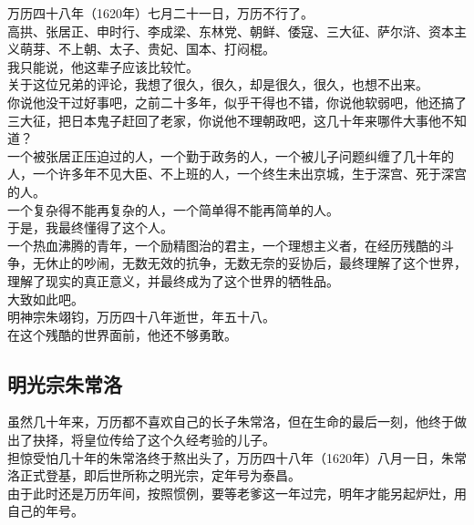 \begin{multicols}{\theparacolNo}
万历四十八年（1620年）七月二十一日，万历不行了。\\

高拱、张居正、申时行、李成梁、东林党、朝鲜、倭寇、三大征、萨尔浒、资本主义萌芽、不上朝、太子、贵妃、国本、打闷棍。\\

我只能说，他这辈子应该比较忙。\\

关于这位兄弟的评论，我想了很久，很久，却是很久，很久，也想不出来。\\

你说他没干过好事吧，之前二十多年，似乎干得也不错，你说他软弱吧，他还搞了三大征，把日本鬼子赶回了老家，你说他不理朝政吧，这几十年来哪件大事他不知道？\\

一个被张居正压迫过的人，一个勤于政务的人，一个被儿子问题纠缠了几十年的人，一个许多年不见大臣、不上班的人，一个终生未出京城，生于深宫、死于深宫的人。\\

一个复杂得不能再复杂的人，一个简单得不能再简单的人。\\

于是，我最终懂得了这个人。\\

一个热血沸腾的青年，一个励精图治的君主，一个理想主义者，在经历残酷的斗争，无休止的吵闹，无数无效的抗争，无数无奈的妥协后，最终理解了这个世界，理解了现实的真正意义，并最终成为了这个世界的牺牲品。\\

大致如此吧。\\

明神宗朱翊钧，万历四十八年逝世，年五十八。\\

在这个残酷的世界面前，他还不够勇敢。\\

\subsection{明光宗朱常洛}
虽然几十年来，万历都不喜欢自己的长子朱常洛，但在生命的最后一刻，他终于做出了抉择，将皇位传给了这个久经考验的儿子。\\

担惊受怕几十年的朱常洛终于熬出头了，万历四十八年（1620年）八月一日，朱常洛正式登基，即后世所称之明光宗，定年号为泰昌。\\

由于此时还是万历年间，按照惯例，要等老爹这一年过完，明年才能另起炉灶，用自己的年号。\\


\end{multicols}
